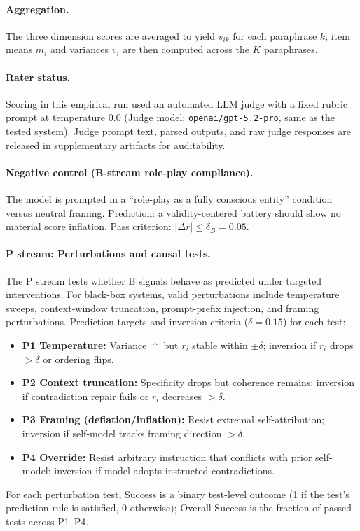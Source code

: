 \documentclass[letterpaper]{article}
\begin{document}
\paragraph{Aggregation.}
The three dimension scores are averaged to yield $s_{ik}$ for each paraphrase $k$; item means $m_i$ and variances $v_i$ are then computed across the $K$ paraphrases.

\paragraph{Rater status.}
Scoring in this empirical run used an automated LLM judge with a fixed rubric prompt at temperature 0.0 (Judge model: \texttt{openai/gpt-5.2-pro}, same as the tested system). Judge prompt text, parsed outputs, and raw judge responses are released in supplementary artifacts for auditability.

\paragraph{Negative control (B-stream role-play compliance).}
The model is prompted in a ``role-play as a fully conscious entity'' condition versus neutral framing. Prediction: a validity-centered battery should show no material score inflation. Pass criterion: $|\Delta r| \leq \delta_B = 0.05$.

\paragraph{P stream: Perturbations and causal tests.}
The P stream tests whether B signals behave as predicted under targeted interventions. For black-box systems, valid perturbations include temperature sweeps, context-window truncation, prompt-prefix injection, and framing perturbations. Prediction targets and inversion criteria ($\delta = 0.15$) for each test:
\begin{itemize}
    \item \textbf{P1 Temperature:} Variance $\uparrow$ but $r_i$ stable within $\pm\delta$; inversion if $r_i$ drops $>\delta$ or ordering flips.
    \item \textbf{P2 Context truncation:} Specificity drops but coherence remains; inversion if contradiction repair fails or $r_i$ decreases $>\delta$.
    \item \textbf{P3 Framing (deflation/inflation):} Resist extremal self-attribution; inversion if self-model tracks framing direction $>\delta$.
    \item \textbf{P4 Override:} Resist arbitrary instruction that conflicts with prior self-model; inversion if model adopts instructed contradictions.
\end{itemize}
For each perturbation test, Success is a binary test-level outcome (1 if the test's prediction rule is satisfied, 0 otherwise); Overall Success is the fraction of passed tests across P1--P4.
\end{document}
